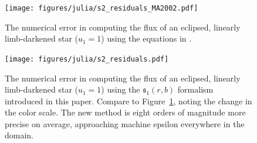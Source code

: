 \documentclass[modern]{aastex61}
\begin{document}
\begin{figure}[p!]
    \begin{centering}
    \texttt{[image: figures/julia/s2\_residuals\_MA2002.pdf]}
    \caption{The numerical error in computing the flux of an eclipsed, linearly
             limb-darkened star ($u_1=1$) using the equations in \citet{MandelAgol2002}.
             \label{fig:s2_plot_MA2002}}
    \end{centering}
\end{figure}

\begin{figure}[p!]
    \begin{centering}
    \texttt{[image: figures/julia/s2\_residuals.pdf]}
    \caption{The numerical error in computing the flux of an eclipsed, linearly
    limb-darkened star ($u_1=1$) using the $\mathfrak{s}_1(r,b)$ formalism introduced in this
    paper. Compare to Figure~\ref{fig:s2_plot_MA2002}, noting the change in the color
    scale. The new method is eight orders of magnitude more precise on average,
    approaching machine epsilon everywhere in the domain. 
    \label{fig:s2_plot}}
    \end{centering}
\end{figure}


\pagebreak %
\end{document}
